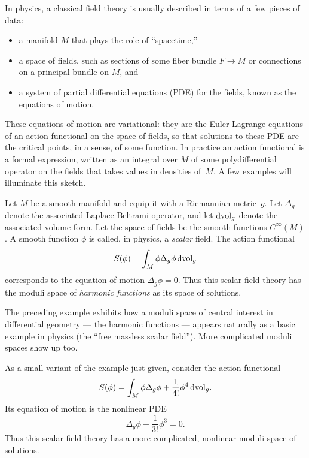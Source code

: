 \documentclass[11pt]{amsart}
\begin{document}
In physics, a classical field theory is usually described in terms of a few pieces of data:
\begin{itemize}
\item a manifold $M$ that plays the role of ``spacetime,''
\item a space of fields, such as sections of some fiber bundle $F \to M$ or connections on a principal bundle on $M$, and
\item a system of partial differential equations (PDE) for the fields, known as the equations of motion.
\end{itemize}
These equations of motion are variational: 
they are the Euler-Lagrange equations of an action functional on the space of fields,
so that solutions to these PDE are the critical points, in a sense, of some function.
In practice an action functional is a formal expression, 
written as an integral over $M$ of some polydifferential operator on the fields that takes values in densities of~$M$.
A few examples will illuminate this sketch.

\begin{eg}
\label{eg: massless scalar}
Let $M$ be a smooth manifold and equip it with a Riemannian metric~$g$.
Let $\Delta_g$ denote the associated Laplace-Beltrami operator, 
and let ${\rm d}{\rm vol}_g$ denote the associated volume form.
Let the space of fields be the smooth functions $C^\infty(M)$.
A smooth function $\phi$ is called, in physics, a {\em scalar} field.
The action functional
\[
S(\phi) = \int_M \phi \Delta_g \phi \, {\rm d}{\rm vol}_g
\]
corresponds to the equation of motion $\Delta_g \phi = 0$. 
Thus this scalar field theory has the moduli space of {\em harmonic functions} as its space of solutions.
\end{eg}

The preceding example exhibits how a moduli space of central interest in differential geometry --- the harmonic functions --- appears naturally as a basic example in physics (the ``free massless scalar field'').
More complicated moduli spaces show up too.

\begin{eg}
As a small variant of the example just given,
consider the action functional
\[
S(\phi) = \int_M \phi \Delta_g \phi + \frac{1}{4!} \phi^4\, {\rm d}{\rm vol}_g.
\]
Its equation of motion is the nonlinear PDE 
\[
\Delta_g \phi + \frac{1}{3!} \phi^3 = 0.
\] 
Thus this scalar field theory has a more complicated, nonlinear moduli space of solutions.
\end{eg}
\end{document}
